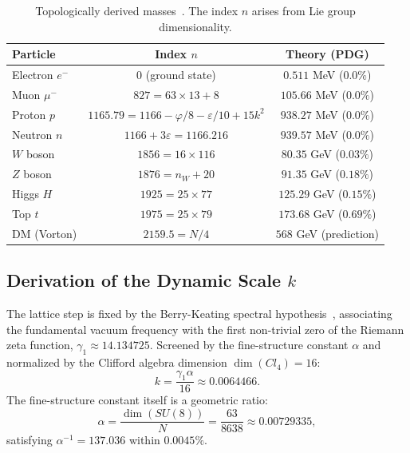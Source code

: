 \documentclass[reprint,aps,prd,twocolumn,showkeys,nofootinbib]{revtex4-2}
\begin{document}
\begin{table}[h]
\caption{Topologically derived masses~\cite{PDG2024}. The index $n$ arises from Lie group dimensionality.}
\begin{ruledtabular}
\begin{tabular}{lcc}
\textbf{Particle} & \textbf{Index $n$} & \textbf{Theory (PDG)} \\
\hline
Electron $e^-$ & $0$ (ground state) & $0.511$ MeV ($0.0\%$) \\
Muon $\mu^-$ & $827 = 63\times13+8$ & $105.66$ MeV ($0.0\%$) \\
Proton $p$ & $1165.79 = 1166-\varphi/8-\varepsilon/10+15k^2$ & $938.27$ MeV ($0.0\%$) \\
Neutron $n$ & $1166+3\varepsilon = 1166.216$ & $939.57$ MeV ($0.0\%$) \\
$W$ boson & $1856 = 16\times116$ & $80.35$ GeV ($0.03\%$) \\
$Z$ boson & $1876 = n_W+20$ & $91.35$ GeV ($0.18\%$) \\
Higgs $H$ & $1925 = 25\times77$ & $125.29$ GeV ($0.15\%$) \\
Top $t$ & $1975 = 25\times79$ & $173.68$ GeV ($0.69\%$) \\
\hline
DM (Vorton) & $2159.5 = N/4$ & $568$ GeV (prediction) \\
\end{tabular}
\end{ruledtabular}
\end{table}

\subsection{Derivation of the Dynamic Scale $k$}
The lattice step is fixed by the Berry-Keating spectral hypothesis~\cite{Berry1999}, associating the fundamental vacuum frequency with the first non-trivial zero of the Riemann zeta function, $\gamma_1\approx14.134725$. Screened by the fine-structure constant $\alpha$ and normalized by the Clifford algebra dimension $\dim(Cl_4)=16$:
\begin{equation}
k = \frac{\gamma_1 \alpha}{16} \approx 0.0064466.
\label{eq:k}
\end{equation}
The fine-structure constant itself is a geometric ratio:
\begin{equation}
\alpha = \frac{\dim(SU(8))}{N} = \frac{63}{8638} \approx 0.00729335,
\end{equation}
satisfying $\alpha^{-1}=137.036$ within $0.0045\%$.
\end{document}

